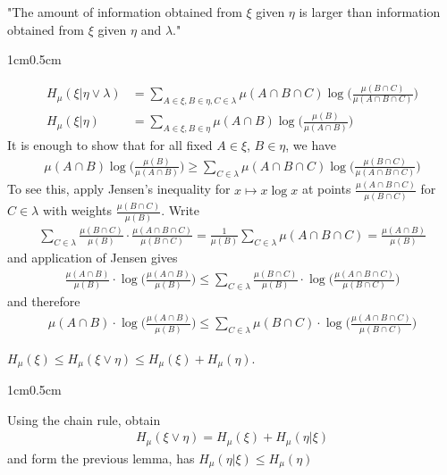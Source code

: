 \documentclass[10pt,a4paper]{report}
\newenvironment{proof}
{\begin{changemargin}{1cm}{0.5cm} 
	}%
	{\end{changemargin}
}
\begin{document}
"The amount of information obtained from $\xi$ given $\eta$ is larger than information obtained from $\xi$ given $\eta$ and $\lambda$."
\begin{proof}
\pf 
\begin{align*}
H_{\mu}(\xi | \eta \vee \lambda) &= \sum_{A \in \xi, B \in \eta, C \in \lambda} \mu(A\cap B \cap C) \log \Big( \frac{\mu(B\cap C)}{\mu(A\cap B \cap C)}\Big) \\
H_{\mu}(\xi | \eta ) &= \sum_{A \in \xi, B \in \eta} \mu(A\cap B ) \log \Big( \frac{\mu(B)}{\mu(A\cap B )}\Big)
\end{align*}
It is enough to show that for all fixed $A \in \xi$, $B\in \eta$, we have
\begin{align*}
\mu(A\cap B) \log \Big( \frac{\mu(B)}{\mu(A\cap B)}\Big) \geq \sum_{C \in \lambda} \mu(A \cap B \cap C) \log \Big( \frac{\mu(B\cap C)}{\mu(A\cap B \cap C)} \Big)
\end{align*}
To see this, apply Jensen's inequality for $x\mapsto x\log x$ at points $\frac{\mu(A\cap B\cap C)}{\mu(B \cap C)}$ for $C \in \lambda$ with weights $\frac{\mu(B\cap C)}{\mu(B)}$. Write
\begin{align*}
\sum_{C\in \lambda } \frac{\mu(B\cap C)}{\mu(B)} \cdot \frac{\mu(A\cap B \cap C)}{\mu(B\cap C)} = \frac{1}{\mu(B)} \sum_{C\in \lambda} \mu(A\cap B \cap C) = \frac{\mu(A\cap B)}{\mu(B)}
\end{align*}
and application of Jensen gives
\begin{align*}
\frac{\mu(A\cap B)}{\mu(B)}\cdot \log \Big( \frac{\mu(A\cap B)}{\mu(B)} \Big) \leq \sum_{C\in \lambda} \frac{\mu(B\cap C)}{\mu(B)} \cdot \log\Big( \frac{\mu(A\cap B \cap C)}{\mu(B\cap C)} \Big)
\end{align*}
and therefore
\begin{align*}
\mu(A\cap B)\cdot \log \Big( \frac{\mu(A\cap B)}{\mu(B)} \Big) \leq \sum_{C\in \lambda} \mu(B\cap C) \cdot \log \Big( \frac{\mu(A\cap B \cap C)}{\mu(B\cap C)} \Big)
\end{align*}

\eop
\end{proof}
\s

\cor $H_{\mu}(\xi) \leq H_{\mu}(\xi \vee \eta) \leq H_{\mu}(\xi) + H_{\mu}(\eta)$.
\begin{proof}
\pf Using the chain rule, obtain
\begin{align*}
H_{\mu}(\xi \vee \eta) = H_{\mu} (\xi)  + H_{\mu}(\eta | \xi)
\end{align*}
and form the previous lemma, has $H_{\mu}(\eta |\xi) \leq H_{\mu}(\eta)$

\eop
\end{proof}
\s
\end{document}
